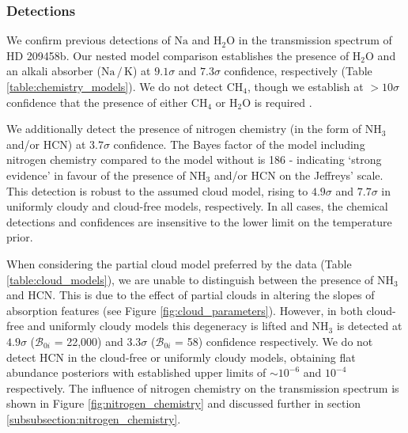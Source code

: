 \documentclass[fleqn,usenatbib]{mnras}
\begin{document}
\subsubsection{Detections}\label{subsubsection:results_detections}

We confirm previous detections of $\mathrm{Na}$ \citep{Charbonneau2002,Snellen2008} and $\mathrm{H_{2}O}$ \citep{Deming2013} in the transmission spectrum of HD 209458b. Our nested model comparison establishes the presence of $\mathrm{H_{2}O}$ and an alkali absorber ($\mathrm{Na \, / \, K}$) at $9.1\sigma$ and $7.3\sigma$ confidence, respectively (Table \ref{table:chemistry_models}). We do not detect $\mathrm{CH_4}$, though we establish at $>10\sigma$ confidence that the presence of either $\mathrm{CH_4}$ or $\mathrm{H_{2}O}$ is required \citep[due to their overlapping absorption features at 1.15 \micron \, and 1.40 \micron \, -- see][and Figure \ref{fig:cross_sections}]{Benneke2013}.

We additionally detect the presence of nitrogen chemistry (in the form of $\mathrm{NH_3}$ and/or $\mathrm{HCN}$) at $3.7\sigma$ confidence. The Bayes factor of the model including nitrogen chemistry compared to the model without is 186 - indicating `strong evidence' in favour of the presence of $\mathrm{NH_3}$ and/or $\mathrm{HCN}$ on the Jeffreys' scale. This detection is robust to the assumed cloud model, rising to $4.9\sigma$ and $7.7\sigma$ in uniformly cloudy and cloud-free models, respectively. In all cases, the chemical detections and confidences are insensitive to the lower limit on the temperature prior.

When considering the partial cloud model preferred by the data (Table \ref{table:cloud_models}), we are unable to distinguish between the presence of $\mathrm{NH_3}$ and $\mathrm{HCN}$. This is due to the effect of partial clouds in altering the slopes of absorption features (see Figure \ref{fig:cloud_parameters}). However, in both cloud-free and uniformly cloudy models this degeneracy  is lifted and $\mathrm{NH_3}$ is detected at $4.9\sigma$ ($\mathcal{B}_{0i}$ = 22,000) and $3.3\sigma$ ($\mathcal{B}_{0i}$ = 58) confidence respectively. We do not detect $\mathrm{HCN}$ in the cloud-free or uniformly cloudy models, obtaining flat abundance posteriors with established upper limits of $\sim 10^{-6}$ and $10^{-4}$ respectively. The influence of nitrogen chemistry on the transmission spectrum is shown in Figure \ref{fig:nitrogen_chemistry} and discussed further in section \ref{subsubsection:nitrogen_chemistry}.
\end{document}
